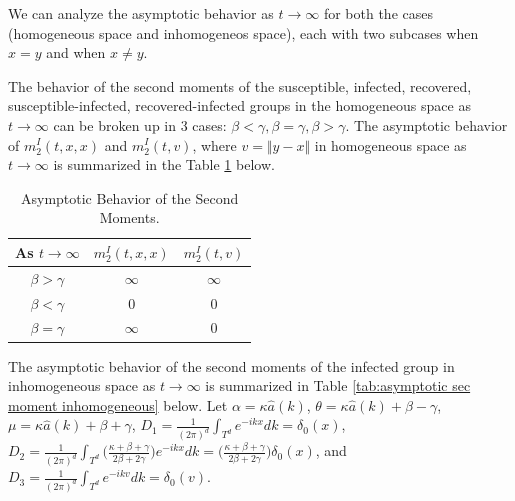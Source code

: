 \documentclass[sn-basic]{sn-jnl}%
\theoremstyle{thmstyleone}%
\theoremstyle{thmstyletwo}%
\theoremstyle{thmstylethree}%
\numberwithin{equation}{theorem}
\begin{document}
We can analyze the asymptotic behavior as $t \rightarrow \infty$ for both the cases (homogeneous space and inhomogeneos space), each with two subcases when $x=y$ and when $x \neq y$.

The behavior of the second moments of the susceptible, infected, recovered, susceptible-infected, recovered-infected groups in the homogeneous space as $t \longrightarrow \infty$ can be broken up in 3 cases: $\beta<\gamma, \beta=\gamma, \beta>\gamma$. The asymptotic behavior of  $m_{2}^{I}(t,x,x)$ and $m_{2}^{I}(t,v)$, where $v = \Vert y - x \Vert$ in homogeneous space as $t \longrightarrow \infty$ is summarized in the Table \ref{tab: asymptotic sec moment homogenous} below.

\begin{table}[ht]
\begin{tabular}{ | c | c | c | }
\hline
 As $t \rightarrow \infty$ & $m_{2}^{I}(t,x,x)$ & $m_{2}^{I}(t,v)$\\
\hline
$\beta > \gamma$ & $ \infty$ & $ \infty$\\ 
\hline
$\beta < \gamma$ & $ 0$ & $ 0$ \\
\hline
$\beta = \gamma$ & $ \infty$ & $ 0$ \\
\hline
\end{tabular}
\caption{Asymptotic Behavior of the Second Moments.}
\label{tab: asymptotic sec moment homogenous}
\end{table}

The asymptotic behavior of the second moments of the infected group in inhomogeneous space as $t \longrightarrow \infty$ is summarized in Table \ref{tab:asymptotic sec moment inhomogeneous} below. Let $\alpha = \kappa \hat{a}(k)$, $\theta = \kappa\hat{a}(k)+\beta-\gamma$, $\mu = \kappa\hat{a}(k)+\beta+\gamma$, $D_{1}= \displaystyle \frac{1}{(2\pi)^d}\int_{T^d}e^{\displaystyle -ikx} dk = \delta_0(x)$, $D_{2}= \displaystyle \frac{1}{(2\pi)^d}\int_{T^d} \Big(\displaystyle \frac{\kappa+\beta+\gamma}{2\beta+2\gamma}\Big) e^{\displaystyle -ikx}dk = \Big(\displaystyle \frac{\kappa+\beta+\gamma}{2\beta+2\gamma}\Big) \delta_0(x)$, and $D_{3}= \displaystyle \frac{1}{(2\pi)^d}\int_{T^d}e^{\displaystyle -ikv} dk= \delta_0(v)$.
\end{document}
